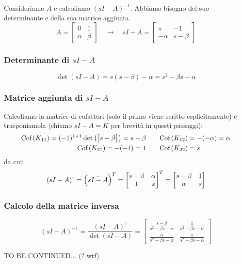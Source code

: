  
\newpage
\begin{esem}
Consideriamo $A$ e calcoliamo $(sI-A)^{-1}$. Abbiamo bisogno del suo determinante e della sua matrice aggiunta.
\begin{equation*}
A = \begin{bmatrix}
0 & 1 \\ \alpha & \beta 
\end{bmatrix} \quad\longrightarrow \quad sI-A = \begin{bmatrix}
s & -1 \\ -\alpha & s- \beta
\end{bmatrix}
\end{equation*}

\subsubsection{Determinante di $sI-A$}
\begin{equation*}
\det(sI-A) = s(s-\beta) -\alpha = s^2 - \beta s -\alpha
\end{equation*}
\subsubsection{Matrice aggiunta di $sI-A$}
Calcoliamo la matrice di cofattori (solo il primo viene scritto esplicitamente) e trasponiamola (chiamo $sI-A = K$ per brevità in questi passaggi):
\begin{align*}
\textrm{Cof}\left( K_{11} \right) = (-1)^{1+1} \det\left( \begin{bmatrix}
s-\beta
\end{bmatrix} \right) = s-\beta \quad & \quad
\textrm{Cof}\left( K_{12} \right) = -(-\alpha) = \alpha \\
\textrm{Cof}\left( K_{21} \right) = -(-1) = 1 \quad & \quad \textrm{Cof}\left( K_{22} \right) = s
\end{align*}
da cui:
\begin{equation*}
(sI-A)^\dag = \left( \hat{sI-A} \right)^T = \begin{bmatrix}
s-\beta & \alpha \\ 1 & s
\end{bmatrix}^T = \begin{bmatrix}
s-\beta & 1 \\
\alpha & s
\end{bmatrix}
\end{equation*}
\subsubsection{Calcolo della matrice inversa}
\begin{equation*}
(sI-A)^{-1} = \frac{(sI-A)^\dag}{\det(sI-A)} = \begin{bmatrix}
\displaystyle\frac{s-\beta}{s^2-\beta s -\alpha} & \displaystyle\frac{1}{s^2-\beta s -\alpha} \\[0.4cm] 
\displaystyle\frac{\alpha}{s^2-\beta s -\alpha} & \displaystyle\frac{s}{s^2-\beta s -\alpha}
\end{bmatrix}
\end{equation*}
\begin{center}
TO BE CONTINUED... (? wtf)
\end{center}
\end{esem}

















